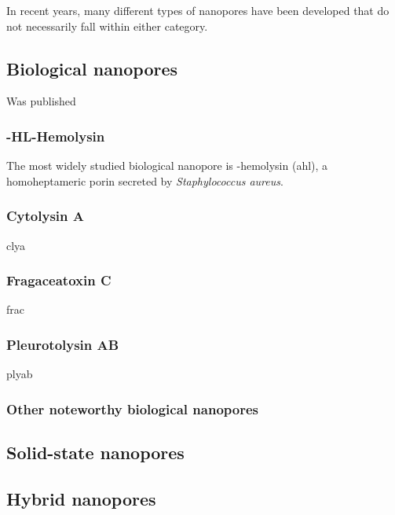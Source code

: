 In recent years, many different types of nanopores have been developed that do not necessarily fall within either category. 





\subsection{Biological nanopores}



Was published \cite{Willems-VanMeervelt-2017}

\subsubsection{\textalpha-HL\textalpha-Hemolysin}

The most widely studied biological nanopore is \textalpha-hemolysin (\gls{ahl}), a homoheptameric porin
secreted by \textit{Staphylococcus aureus}.



\subsubsection{Cytolysin A}

\gls{clya}

\subsubsection{Fragaceatoxin C}

\gls{frac}

\subsubsection{Pleurotolysin AB}

\gls{plyab}

\subsubsection{Other noteworthy biological nanopores}

\subsection{Solid-state nanopores}

\subsection{Hybrid nanopores}



